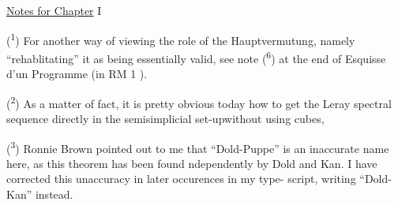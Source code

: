 
\uline{Notes for Chapter} I

(\textsuperscript{1}) For another way of viewing the role of the Hauptvermutung, namely
``rehablitating'' it as being essentially valid, see note (\textsuperscript{6}) at the end
of Esquisse d'un Programme (in RM 1 ).

(\textsuperscript{2}) As a matter of fact, it is pretty obvious today how to get the
Leray spectral sequence directly in the semisimplicial set-up\hand{,}without
using cubes,

(\textsuperscript{3}) Ronnie Brown pointed out to me that ``Dold-Puppe'' is an inaccurate
 name here, as this theorem has been found ndependently by Dold and
Kan. I have corrected this unaccuracy in later occurences in my type-%
script, writing ``Dold-Kan'' instead.

